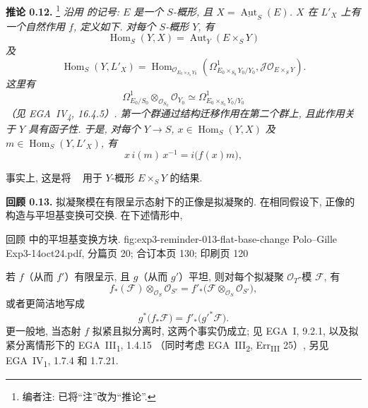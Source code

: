 \medskip
\noindent{}\textbf{推论 0.12.}
\footnote{编者注: 已将“注”改为“推论”.}
\textit{沿用  的记号:
\(E\) 是一个 \(S\)-概形, 且 \(X=\underline{\operatorname{Aut}}_S(E)\).
\(X\) 在 \(L'_X\) 上有一个自然作用 \(f\), 定义如下.
对每个 \(S\)-概形 \(Y\), 有}
\[
 \operatorname{Hom}_S(Y,X)=\operatorname{Aut}_Y(E\times_S Y)
\]
\textit{及}
\[
 \operatorname{Hom}_S(Y,L'_X)
 =\operatorname{Hom}_{\mathscr O_{E_0\times_{S_0}Y_0}}
 \left(
   \Omega^1_{E_0\times_{S_0}Y_0/Y_0},
   \mathscr J\mathscr O_{E\times_S Y}
 \right).
\]
\textit{这里有}
\[
 \Omega^1_{E_0/S_0}\otimes_{\mathscr O_{S_0}}\mathscr O_{Y_0}
 \simeq \Omega^1_{E_0\times_{S_0}Y_0/Y_0}
\]
\textit{（见 EGA~IV\textsubscript{4}, 16.4.5）.
第一个群通过结构迁移作用在第二个群上, 且此作用关于 \(Y\) 具有函子性.
于是, 对每个 \(Y\to S\), \(x\in\operatorname{Hom}_S(Y,X)\) 及
\(m\in\operatorname{Hom}_S(Y,L'_X)\), 有}
\begin{equation}
 x\,i(m)\,x^{-1}=i\bigl(f(x)m\bigr),
 \tag{0.12.1}\label{sga3:iii:corollary:0-12:equation:0-12-1}
\end{equation}

事实上, 这是将 ~
用于 \(Y\)-概形 \(E\times_S Y\) 的结果.

\medskip
\noindent{}\textbf{回顾 0.13.}
拟凝聚模在有限呈示态射下的正像是拟凝聚的.
在相同假设下, 正像的构造与平坦基变换可交换. 在下述情形中,

  {回顾  中的平坦基变换方块.}
  {fig:exp3-reminder-013-flat-base-change}
  {Polo--Gille Exp3-14oct24.pdf, 分篇页 20; 合订本页 130; 印刷页 120}

若 \(f\)（从而 \(f'\)）有限呈示, 且 \(g\)（从而 \(g'\)）平坦,
则对每个拟凝聚 \(\mathscr O_T\)-模 \(\mathscr F\), 有
\[
 f_*(\mathscr F)\otimes_{\mathscr O_S}\mathscr O_{S'}
 =f'_*\bigl(\mathscr F\otimes_{\mathscr O_S}\mathscr O_{S'}\bigr),
\]
或者更简洁地写成
\[
 g^*\bigl(f_*\mathscr F\bigr)=f'_*\bigl(g'^*\mathscr F\bigr).
\]
更一般地, 当态射 \(f\) 拟紧且拟分离时, 这两个事实仍成立;
见 EGA~I, 9.2.1, 以及拟紧分离情形下的
EGA~III\textsubscript{1}, 1.4.15
（同时考虑 EGA~III\textsubscript{2}, Err\textsubscript{III} 25）,
另见 EGA~IV\textsubscript{1}, 1.7.4 和 1.7.21.


